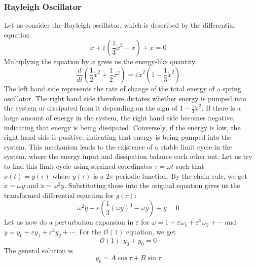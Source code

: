 \documentclass{article}
\newcommand{\od}[2]{\frac{d #1}{d #2}}
\begin{document}
\subsubsection{Rayleigh Oscillator}
Let us consider the Rayleigh oscillator, which is described by the differential equation
\begin{equation*}
    \ddot x + \varepsilon\left( \frac{1}{3} \dot x^3 - \dot x \right) + x = 0
\end{equation*}
Multiplying the equation by $\dot x$ gives us the energy-like quantity
\begin{equation*}
    \od{}{t} \left( \frac{1}{2} \dot x^2 + \frac{1}{2} x^2 \right) = \varepsilon \dot x^2 \left( 1 - \frac{1}{3} \dot x^2 \right)
\end{equation*}
The left hand side represents the rate of change of the total energy of a spring oscillator. The right hand side therefore dictates whether energy is pumped into the system or dissipated from it depending on the sign of $1-\frac{1}{3} \dot x^2$. If there is a large amount of energy in the system, the right hand side becomes negative, indicating that energy is being dissipated. Conversely, if the energy is low, the right hand side is positive, indicating that energy is being pumped into the system. This mechanism leads to the existence of a stable limit cycle in the system, where the energy input and dissipation balance each other out. Let us try to find this limit cycle using strained coordinates $\tau =\omega t$ such that $x(t) = y(\tau)$ where $y(\tau)$ is a $2\pi$-periodic function. By the chain rule, we get $\dot x = \omega \dot y$ and $\ddot x = \omega^2 \ddot y$. Substituting these into the original equation gives us the transformed differential equation for $y(\tau)$:
\begin{equation*}
    \omega^2  \ddot y + \varepsilon\left( \frac{1}{3} (\omega \dot y)^3 - \omega \dot y \right) + y = 0
\end{equation*}
Let us now do a perturbation expansion in $\varepsilon$ for $\omega = 1 + \varepsilon \omega_1 + \varepsilon^2 \omega_2 + \cdots$ and $y = y_0 + \varepsilon y_1 + \varepsilon^2 y_2 + \cdots$. For the $\mathcal{O}(1)$ equation, we get
\begin{equation*}
    \mathcal{O}(1): \ddot y_0 + y_0 = 0
\end{equation*}
The general solution is
\begin{equation*}
    y_0 = A \cos \tau + B \sin \tau
\end{equation*}
\end{document}
